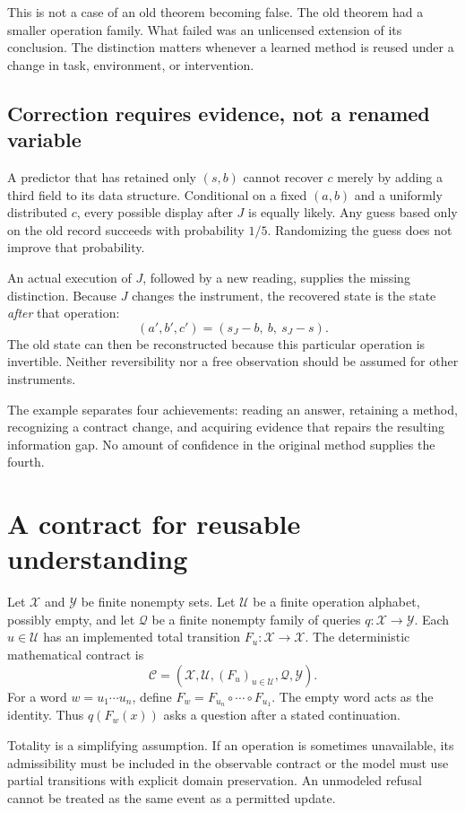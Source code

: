 \documentclass[11pt,letterpaper]{article}
\theoremstyle{plain}
\theoremstyle{definition}
\newcommand{\X}{\mathcal X}\newcommand{\Z}{\mathcal Z}
\newcommand{\U}{\mathcal U}\newcommand{\Q}{\mathcal Q}
\newcommand{\Y}{\mathcal Y}\newcommand{\C}{\mathcal C}
\begin{document}
This is not a case of an old theorem becoming false. The old theorem had a smaller operation family. What failed was an unlicensed extension of its conclusion. The distinction matters whenever a learned method is reused under a change in task, environment, or intervention.

\subsection{Correction requires evidence, not a renamed variable}
A predictor that has retained only $(s,b)$ cannot recover $c$ merely by adding a third field to its data structure. Conditional on a fixed $(a,b)$ and a uniformly distributed $c$, every possible display after $J$ is equally likely. Any guess based only on the old record succeeds with probability $1/5$. Randomizing the guess does not improve that probability.

An actual execution of $J$, followed by a new reading, supplies the missing distinction. Because $J$ changes the instrument, the recovered state is the state \emph{after} that operation:
\begin{equation}\label{eq:recover-after-J}
(a',b',c')=(s_J-b,\ b,\ s_J-s).
\end{equation}
The old state can then be reconstructed because this particular operation is invertible. Neither reversibility nor a free observation should be assumed for other instruments.

The example separates four achievements: reading an answer, retaining a method, recognizing a contract change, and acquiring evidence that repairs the resulting information gap. No amount of confidence in the original method supplies the fourth.

\section{A contract for reusable understanding}\label{sec:contract}
Let $\X$ and $\Y$ be finite nonempty sets. Let $\U$ be a finite operation alphabet, possibly empty, and let $\Q$ be a finite nonempty family of queries $q:\X\to\Y$. Each $u\in\U$ has an implemented total transition $F_u:\X\to\X$. The deterministic mathematical contract is
\[
\C=(\X,\U,(F_u)_{u\in\U},\Q,\Y).
\]
For a word $w=u_1\cdots u_n$, define $F_w=F_{u_n}\circ\cdots\circ F_{u_1}$. The empty word acts as the identity. Thus $q(F_w(x))$ asks a question after a stated continuation.

Totality is a simplifying assumption. If an operation is sometimes unavailable, its admissibility must be included in the observable contract or the model must use partial transitions with explicit domain preservation. An unmodeled refusal cannot be treated as the same event as a permitted update.
\end{document}
